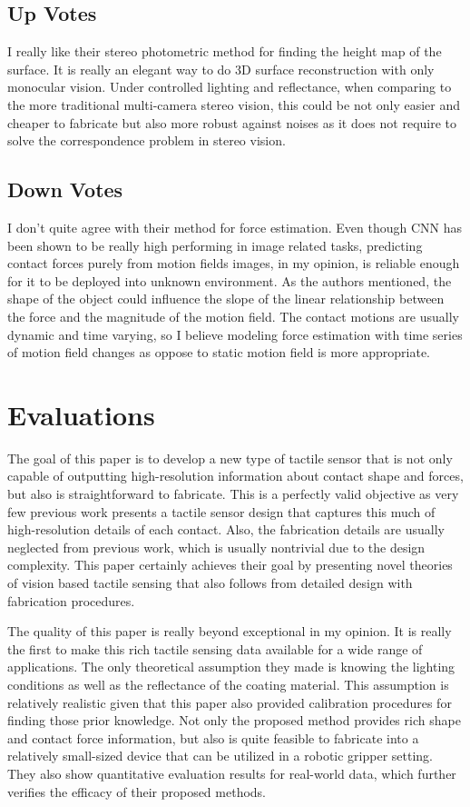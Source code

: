 \documentclass[10pt, twocolumn]{article}
\begin{document}
\subsection{Up Votes}
I really like their stereo photometric method for finding the height
map of the surface. It is really an elegant way to do 3D surface reconstruction
with only monocular vision. Under controlled lighting and reflectance, when comparing
to the more traditional multi-camera stereo vision, this could be not only
easier and cheaper to fabricate but also more robust against noises as it
does not require to solve the correspondence problem in stereo vision.

\subsection{Down Votes}
I don't quite agree with their method for force estimation. Even though CNN
has been shown to be really high performing in image related tasks, predicting
contact forces purely from motion fields images, in my opinion, is reliable
enough for it to be deployed into unknown environment. As the authors mentioned,
the shape of the object could influence the slope of the linear relationship between
the force and the magnitude of the motion field. The contact motions are usually
dynamic and time varying, so I believe modeling force estimation with time series
of motion field changes as oppose to static motion field is more appropriate.

\section{Evaluations}
The goal of this paper is to develop a new type of tactile sensor that is
not only capable of outputting high-resolution information about contact
shape and forces, but also is straightforward to fabricate.
This is a perfectly valid objective as very few previous work presents a
tactile sensor design that captures this much of high-resolution details of
each contact. Also, the fabrication details are usually neglected from
previous work, which is usually nontrivial due to the design complexity.
This paper certainly achieves their goal by presenting novel theories of vision
based tactile sensing that also follows from detailed design with fabrication
procedures.

The quality of this paper is really beyond exceptional in my opinion. It is really
the first to make this rich tactile sensing data available for a wide range
of applications. The only theoretical assumption they made is knowing the
lighting conditions as well as the reflectance of the coating material. This
assumption is relatively realistic given that this paper also provided calibration
procedures for finding those prior knowledge. Not only the proposed method
provides rich shape and contact force information, but also is quite feasible
to fabricate into a relatively small-sized device that can be utilized in
a robotic gripper setting. They also show quantitative evaluation results
for real-world data, which further verifies the efficacy of their proposed methods.
\end{document}
